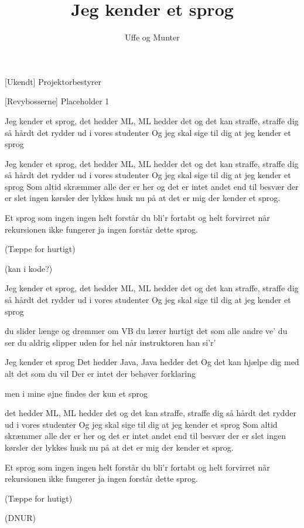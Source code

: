 \documentclass[a4paper,11pt]{article}
\title{Jeg kender et sprog}
\author{Uffe og Munter}
\begin{document}
\maketitle

\begin{roles}   
[Ukendt] Projektorbestyrer
\end{roles}

\begin{props}
[Revybosserne] Placeholder 1
\end{props}

\begin{song}	

Jeg kender et sprog,
det hedder ML, ML hedder det
og det kan straffe, straffe dig så hårdt
det rydder ud i vores studenter
Og jeg skal sige til dig at jeg kender et sprog

Jeg kender et sprog,
det hedder ML, ML hedder det
og det kan straffe, straffe dig så hårdt
det rydder ud i vores studenter
Og jeg skal sige til dig at jeg kender et sprog
Som altid skræmmer alle der er her
og det er intet andet end til besvær
der er slet ingen kørsler der lykkes
husk nu på at det er mig der kender et sprog.

Et sprog som ingen ingen helt forstår
du bli'r fortabt og helt forvirret når
rekursionen ikke fungerer
ja ingen forstår dette sprog.

(Tæppe for hurtigt)

(kan i kode?)

Jeg kender et sprog,
det hedder ML, ML hedder det
og det kan straffe, straffe dig så hårdt
det rydder ud i vores studenter
Og jeg skal sige til dig at jeg kender et sprog

du slider længe og drømmer om VB
du lærer hurtigt det som alle andre ve'
du ser du aldrig slipper uden for hel
når instruktoren han si'r'

Jeg kender et sprog
Det hedder Java, Java hedder det
Og det kan hjælpe dig med alt det som du vil
Der er intet der behøver forklaring

men i mine øjne findes der kun et sprog

 det hedder ML, ML hedder det
og det kan straffe, straffe dig så hårdt
det rydder ud i vores studenter
Og jeg skal sige til dig at jeg kender et sprog
Som altid skræmmer alle der er her
og det er intet andet end til besvær
der er slet ingen kørsler der lykkes
husk nu på at det er mig der kender et sprog.

Et sprog som ingen ingen helt forstår
du bli'r fortabt og helt forvirret når
rekursionen ikke fungerer
ja ingen forstår dette sprog.

(Tæppe for hutigt)

(DNUR)



\end{song}
\end{document}
